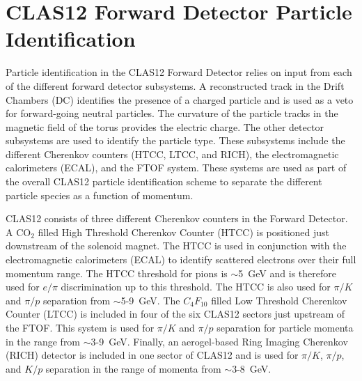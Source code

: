 \documentclass{elsart}
\begin{document}
\section{CLAS12 Forward Detector Particle Identification}
\label{clas12-fd-pid}

Particle identification in the CLAS12 Forward Detector relies on input from each of the different
forward detector subsystems. A reconstructed track in the Drift Chambers (DC) identifies the
presence of a charged particle and is used as a veto for forward-going neutral particles. The curvature
of the particle tracks in the magnetic field of the torus provides the electric charge. The other detector
subsystems are used to identify the particle type. These subsystems include the different Cherenkov
counters (HTCC, LTCC, and RICH), the electromagnetic calorimeters (ECAL), and the FTOF system.
These systems are used as part of the overall CLAS12 particle identification scheme to separate the
different particle species as a function of momentum.

CLAS12 consists of three different Cherenkov counters in the Forward Detector. A CO$_2$ filled
High Threshold Cherenkov Counter (HTCC) is positioned just downstream of the solenoid magnet. The
HTCC is used in conjunction with the electromagnetic calorimeters (ECAL) to identify scattered electrons
over their full momentum range. The HTCC threshold for pions is $\sim$5~GeV and is therefore used for
$e/\pi$ discrimination up to this threshold. The HTCC is also used for $\pi/K$ and $\pi/p$ separation
from $\sim$5-9~GeV. The $C_4F_{10}$ filled Low Threshold Cherenkov Counter (LTCC) is included in four
of the six CLAS12 sectors just upstream of the FTOF. This system is used for $\pi/K$ and $\pi/p$
separation for particle momenta in the range from $\sim$3-9~GeV. Finally, an aerogel-based Ring Imaging
Cherenkov (RICH) detector is included in one sector of CLAS12 and is used for $\pi/K$, $\pi/p$, and $K/p$
separation in the range of momenta from $\sim$3-8~GeV.
\end{document}
